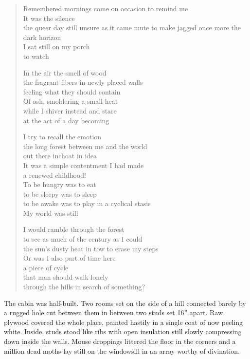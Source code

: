 \documentclass[ebook, 10pt, openright, onecolumn]{memoir}
\newlength{\drop}
\newenvironment{poetry}
{
  \begin{quote}
    \begin{itshape}
      \small
    }
    {
    \end{itshape}
  \end{quote}
}
\begin{document}
\begin{poetry}
  Remembered mornings come on occasion to remind me\\
  It was the silence\\
  the queer day still unsure as it came mute to make jagged
  once more the dark horizon\\
  I sat still on my porch\\
  to watch
  
  In the air the smell of wood\\
  the fragrant fibers in newly placed walls\\
  feeling what they should contain\\
  Of ash, smoldering a small heat\\
  while I shiver instead and stare\\
  at the act of a day becoming

  I try to recall the emotion\\
  the long forest between me and the world\\
  out there inchoat in idea\\
  It was a simple contentment I had made\\
  a renewed childhood!\\
  To be hungry was to eat\\
  to be sleepy was to sleep\\
  to be awake was to play in a cyclical stasis\\
  My world was still
  
  I would ramble through the forest\\
  to see as much of the century as I could\\
  the sun's dusty heat in tow to erase my steps\\
  Or was I also part of time here\\
  a piece of cycle\\
  that man should walk lonely\\
  through the hills in search of something?
\end{poetry}


The cabin was half-built.  Two rooms set on the side of a hill connected barely
by a rugged hole cut between them in between two studs set 16'' apart.  Raw
plywood covered the whole place, painted hastily in a single coat of now peeling
white.  Inside, studs stood like ribs with open insulation still slowly
compressing down inside the walls.  Mouse droppings littered the floor in the
corners and a million dead moths lay still on the windowsill in an array
worthy of divination.
\end{document}
